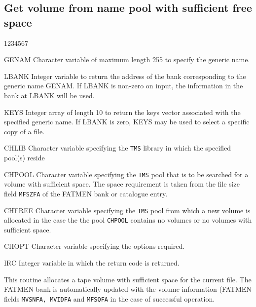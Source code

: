 \subsection{Get volume from name pool with sufficient free space} 
\begin{DLtt}{1234567}
\item[GENAM]
Character variable of maximum length 255 to specify the generic name.
\item[LBANK]
Integer variable to return the address of the bank corresponding
to the generic name GENAM.
If LBANK is non-zero on input, the information in the 
bank at LBANK will be used.
\item[KEYS]
Integer array of length 10 to return the keys vector associated
with the specified generic name.
If LBANK is zero, KEYS may be used to select a specific
copy of a file.
\item[CHLIB]Character variable specifying the {\tt TMS} library
in which the specified pool(s) reside
\item[CHPOOL]Character variable specifying the {\tt TMS}
pool that is to be searched for a volume with sufficient
space. The space requirement is taken from the file size
field {\tt MFSZFA} of the FATMEN bank or catalogue entry.
\item[CHFREE]Character variable specifying the {\tt TMS}
pool from which a new volume is allocated in the case
the the pool {\tt CHPOOL} contains no volumes or no volumes
with sufficient space.
\item[CHOPT]
Character variable specifying the options required.
\item[IRC]
Integer variable in which the return code is returned.
\end{DLtt}

This routine allocates a tape volume with sufficient space
for the current file. The FATMEN bank is automatically updated
with the volume information (FATMEN fields {\tt MVSNFA, MVIDFA}
and {\tt MFSQFA} in the case of successful operation.

